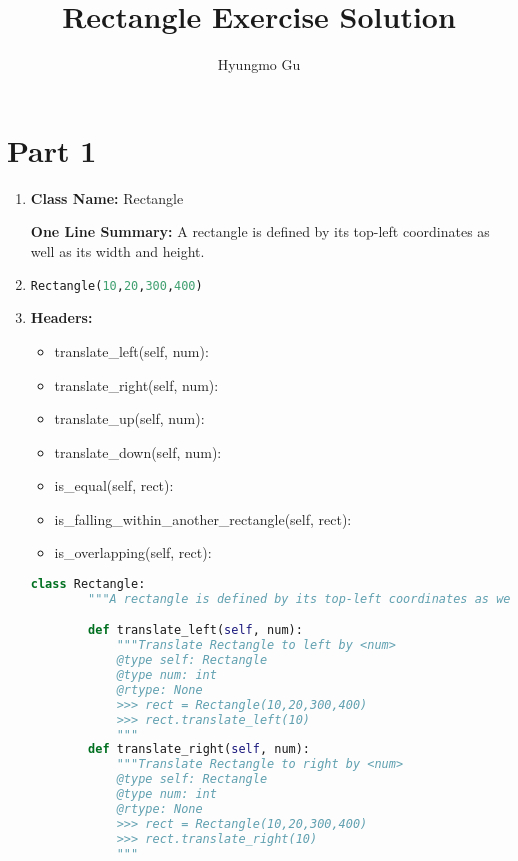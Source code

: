 \documentclass[12pt]{article}
\begin{document}
\title{Rectangle Exercise Solution}
\author{Hyungmo Gu}
\maketitle

\section*{Part 1}
\begin{enumerate}
    \item

    \textbf{Class Name:} Rectangle

    \bigskip

    \textbf{One Line Summary:} A rectangle is defined by its top-left coordinates
    as well as its width and height.

    \item

    \begin{lstlisting}[language=Python]
    Rectangle(10,20,300,400)
    \end{lstlisting}

    \item

    \textbf{Headers:}

    \bigskip

    \begin{itemize}
        \item translate\_left(self, num):
        \item translate\_right(self, num):
        \item translate\_up(self, num):
        \item translate\_down(self, num):
        \item is\_equal(self, rect):
        \item is\_falling\_within\_another\_rectangle(self, rect):
        \item is\_overlapping(self, rect):
    \end{itemize}

    \begin{lstlisting}[language=Python]
    class Rectangle:
        """A rectangle is defined by its top-left coordinates as well as its width and height."""

        def translate_left(self, num):
            """Translate Rectangle to left by <num>
            @type self: Rectangle
            @type num: int
            @rtype: None
            >>> rect = Rectangle(10,20,300,400)
            >>> rect.translate_left(10)
            """
        def translate_right(self, num):
            """Translate Rectangle to right by <num>
            @type self: Rectangle
            @type num: int
            @rtype: None
            >>> rect = Rectangle(10,20,300,400)
            >>> rect.translate_right(10)
            """


\end{lstlisting}
\end{enumerate}
\end{document}
